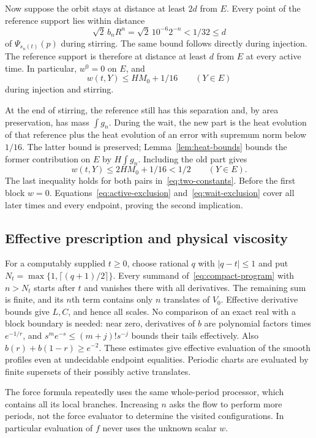 Now suppose the orbit stays at distance at least $2d$ from $E$.
Every point of the reference support lies within distance
\[
 \sqrt2\,b_nR^n=\sqrt2\,10^{-6}2^{-n}<1/32\le d
\]
of $\Psi_{s_n(t)}(p)$ during stirring. The same bound follows directly
during injection. The reference support is therefore at distance at
least $d$ from $E$ at every active time. In particular, $w^0=0$
on $E$, and
\begin{equation}\label{eq:active-exclusion}
 w(t,Y)\le HM_0+1/16\qquad(Y\in E)
\end{equation}
during injection and stirring.

At the end of stirring, the reference still has this separation and,
by area preservation, has mass $\int g_n$. During the wait, the new
part is the heat evolution of that reference plus the heat evolution
of an error with supremum norm below $1/16$. The latter bound is
preserved; Lemma~\ref{lem:heat-bounds} bounds the former contribution
on $E$ by $H\int g_n$. Including the old part gives
\begin{equation}\label{eq:wait-exclusion}
 w(t,Y)\le2HM_0+1/16<1/2\qquad(Y\in E).
\end{equation}
The last inequality holds for both pairs in~\eqref{eq:two-constants}.
Before the first block $w=0$. Equations~\eqref{eq:active-exclusion}
and~\eqref{eq:wait-exclusion} cover all later times and every endpoint,
proving the second implication.

\subsection{Effective prescription and physical viscosity}

For a computably supplied $t\ge0$, choose rational $q$ with
$|q-t|\le1$ and put $N_t=\max\{1,\lceil(q+1)/2\rceil\}$.
Every summand of~\eqref{eq:compact-program} with $n>N_t$ starts after
$t$ and vanishes there with all derivatives. The remaining sum is
finite, and its $n$th term contains only $n$ translates of $V_0$.
Effective derivative bounds give $L,C$, and hence all scales.
No comparison of an exact real with a block boundary is needed:
near zero, derivatives of $b$ are polynomial factors times $e^{-1/r}$,
and $s^m e^{-s}\le(m+j)!s^{-j}$ bounds their tails effectively.
Also $b(r)+b(1-r)\ge e^{-2}$. These estimates give effective
evaluation of the smooth profiles even at undecidable endpoint
equalities. Periodic charts are evaluated by finite supersets of their
possibly active translates.

The force formula repeatedly uses the same whole-period processor,
which contains all its local branches. Increasing $n$ asks the flow
to perform more periods, not the force evaluator to determine the
visited configurations. In particular evaluation of $f$ never uses
the unknown scalar $w$.

